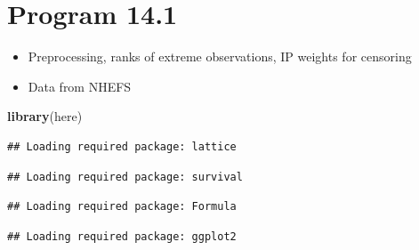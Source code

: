 \documentclass[
  10pt,
]{book}
\newenvironment{Shaded}{\begin{snugshade}}{\end{snugshade}}
\newcommand{\CommentTok}[1]{\textcolor[rgb]{0.56,0.35,0.01}{\textit{#1}}}
\newcommand{\DecValTok}[1]{\textcolor[rgb]{0.00,0.00,0.81}{#1}}
\newcommand{\KeywordTok}[1]{\textcolor[rgb]{0.13,0.29,0.53}{\textbf{#1}}}
\newcommand{\NormalTok}[1]{#1}
\newcommand{\OperatorTok}[1]{\textcolor[rgb]{0.81,0.36,0.00}{\textbf{#1}}}
\newcommand{\StringTok}[1]{\textcolor[rgb]{0.31,0.60,0.02}{#1}}
\providecommand{\tightlist}{%
  \setlength{\itemsep}{0pt}\setlength{\parskip}{0pt}}
\begin{document}
\hypertarget{program-14.1}{%
\section{Program 14.1}\label{program-14.1}}

\begin{itemize}
\tightlist
\item
  Preprocessing, ranks of extreme observations, IP weights for censoring
\item
  Data from NHEFS
\end{itemize}

\begin{Shaded}
\begin{Highlighting}[]
\KeywordTok{library}\NormalTok{(here)}
\end{Highlighting}
\end{Shaded}

\begin{Shaded}
\end{Shaded}

\begin{verbatim}
## Loading required package: lattice
\end{verbatim}

\begin{verbatim}
## Loading required package: survival
\end{verbatim}

\begin{verbatim}
## Loading required package: Formula
\end{verbatim}

\begin{verbatim}
## Loading required package: ggplot2
\end{verbatim}
\end{document}
